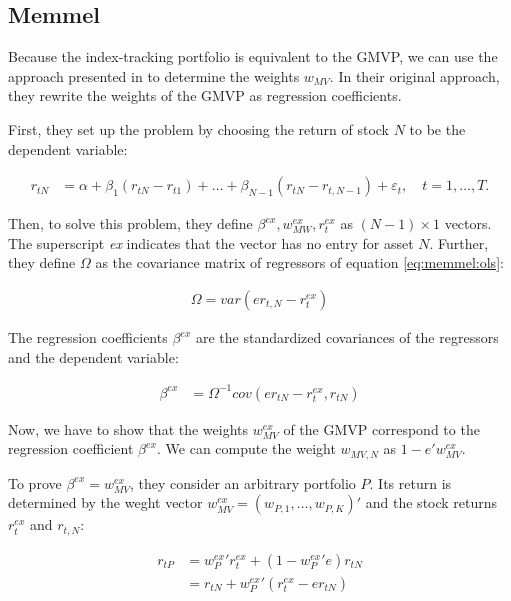 \documentclass[12pt,oneside,a4paper]{memoir}
\begin{document}
\subsection{Memmel}
Because the index-tracking portfolio is equivalent to the GMVP, we can use the approach presented in  to determine the weights $w_{MV}$.
In their original approach, they rewrite the weights of the GMVP as regression coefficients.

First, they set up the problem by choosing the return of stock $N$ to be the dependent variable:

\vspace{-18 pt}
\begin{align}
\label{eq:memmel:ols}
r_{tN} &= \alpha + \beta_{1}(r_{tN}-r_{t1}) + \dots + \beta_{N-1}(r_{tN}-r_{t,N-1})
+ \varepsilon_{t},
\quad
t=1, \dots, T.
\end{align}

\noindent
Then, to solve this problem, they define $\beta^{ex}, w_{MW}^{ex}, r_{t}^{ex}$ as $(N-1) \times 1$ vectors.
The superscript \textit{ex} indicates that the vector has no entry for asset $N$.
Further, they define $\Omega$ as the covariance matrix of regressors of equation \eqref{eq:memmel:ols}:

\vspace{-18 pt}
\begin{align*}
	\Omega = var( e r_{t, N}  - r_{t}^{ex} )
\end{align*}

The regression coefficients $\beta^{ex}$ are the standardized covariances of the regressors and the dependent variable:

\vspace{-18 pt}
\begin{align}
\label{eq:bex}
\beta^{ex} &= \Omega^{-1} cov(e r_{tN} - r_{t}^{ex}, r_{tN})
\end{align}

Now, we have to show that the weights $w_{MV}^{ex}$ of the GMVP correspond to the regression coefficient $\beta^{ex}$.
We can compute the weight $w_{MV, N}$ as $1 - e'w_{MV}^{ex}$.

To prove $\beta^{ex} = w^{ex}_{MV}$, they consider an arbitrary portfolio $P$.
Its return is determined by the weght vector $w^{ex}_{MV}=(w_{P,1}, \dots, w_{P, K})'$ and the stock returns $r^{ex}_{t}$ and $r_{t, N}$:

\vspace{-18 pt}
\begin{align*}
r_{tP} &= w_{P}^{ex}'r_{t}^{ex} + (1- w_{P}^{ex}'e) r_{tN}
\\&=
r_{tN} + w_{P}^{ex}'(r_{t}^{ex} - e r_{tN})
\end{align*}
\end{document}
